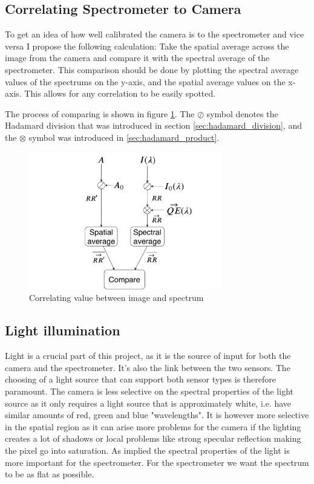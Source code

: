 \subsection{Correlating Spectrometer to Camera}
\label{sec:method_correlating_spectrum_to_camera}
To get an idea of how well calibrated the camera is to the spectrometer and vice versa I propose the following calculation: 
Take the spatial average across the image from the camera and compare it with the spectral average of the spectrometer. This comparison should be done by plotting the spectral average values of the spectrums on the y-axis, and the spatial average values on the x-axis. This allows for any correlation to be easily spotted. 

The process of comparing is shown in figure \ref{fig:correlating_spectrum_and_image}. The $\oslash$ symbol denotes the Hadamard division that was introduced in section \ref{sec:hadamard_division}, and the $\otimes$ symbol was introduced in \ref{sec:hadamard_product}. 

\begin{figure}[h]
    \centering
    \includegraphics[width=0.75\textwidth]{figures/image_comparison_with_spectrometer.pdf}
    \caption{Correlating value between image and spectrum}
    \label{fig:correlating_spectrum_and_image}
\end{figure}


\subsection{Light illumination}
Light is a crucial part of this project, as it is the source of input for both the camera and the spectrometer. It's also the link between the two sensors. The choosing of a light source that can support both sensor types is therefore paramount. The camera is less selective on the spectral properties of the light source as it only requires a light source that is approximately white, i.e. have similar amounts of red, green and blue "wavelengths". It is however more selective in the spatial region as it can arise more problems for the camera if the lighting creates a lot of shadows or local problems like strong specular reflection making the pixel go into saturation. As implied the spectral properties of the light is more important for the spectrometer. For the spectrometer we want the spectrum to be as flat as possible. 

